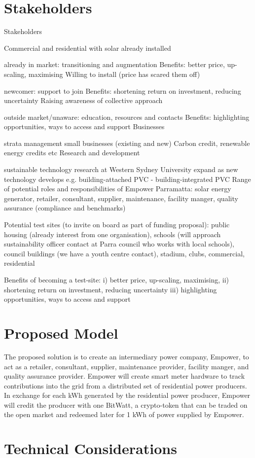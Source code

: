 \documentclass[12pt,twocolumn]{article}
\begin{document}
\section {Stakeholders}

Stakeholders

Commercial and residential with solar already installed

already in market: transitioning and augmentation
Benefits: better price, up-scaling, maximising
Willing to install (price has scared them off)

newcomer: support to join
Benefits: shortening return on investment, reducing uncertainty
Raising awareness of collective approach

outside market/unaware: education, resources and contacts
Benefits: highlighting opportunities, ways to access and support
Businesses

strata management
small businesses (existing and new)
Carbon credit, renewable energy credits etc
Research and development

sustainable technology research at Western Sydney University
expand as new technology develops e.g. building-attached PVC - building-integrated PVC
Range of potential roles and responsibilities of Empower Parramatta: solar energy generator, retailer, consultant, supplier, maintenance, facility manger, quality assurance (compliance and benchmarks)

Potential test sites (to invite on board as part of funding proposal): public housing (already interest from one organisation), schools (will approach sustainability officer contact at Parra council who works with local schools), council buildings (we have a youth centre contact), stadium, clubs, commercial, residential

Benefits of becoming a test-site: i) better price, up-scaling, maximising, ii) shortening return on investment, reducing uncertainty iii) highlighting opportunities, ways to access and support

\section {Proposed Model}

The proposed solution is to create an intermediary power company, Empower, to act as a retailer, consultant, supplier, maintenance provider, facility manger, and  quality assurance provider. Empower will create smart meter hardware to track contributions into the grid from a distributed set of residential power producers. In exchange for each kWh generated by the residential power producer, Empower will credit the producer with one BitWatt, a crypto-token that can be traded on the open market and redeemed later for 1 kWh of power supplied by Empower.

\section {Technical Considerations}
\end{document}
